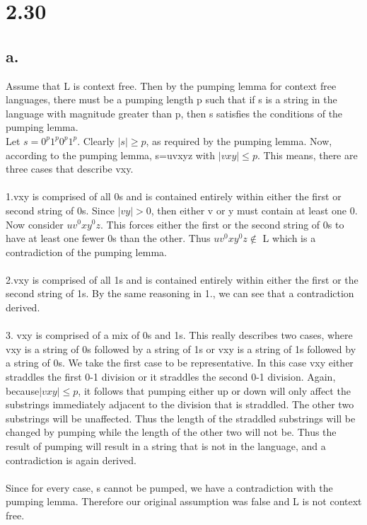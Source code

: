 \documentclass{scrartcl}
\begin{document}
\section*{2.30}
\subsection*{a.}
Assume that L is context free. Then by the pumping lemma for context free languages, there must be a pumping length p such that if s is a string in the language with magnitude greater than p, then s satisfies the conditions of the pumping lemma.\\
Let $s = 0^p1^p0^p1^p$. Clearly $\mid s \mid \geq p$,  as required by the pumping lemma.
Now, according to the pumping lemma, s=uvxyz with $\mid vxy \mid \leq p$. This means, there are three cases that describe vxy. \\
\\
1.vxy is comprised of all 0s and is contained entirely within either the first or second string of 0s. Since $\mid vy \mid > 0$, then either v or y must contain at least one 0. Now consider $uv^0xy^0z$.  This forces either the first or the second string of 0s to have at least one fewer 0s than the other. Thus $uv^0xy^0z \notin $ L which is a contradiction of the pumping
lemma.
\\
\\
2.vxy is comprised of all 1s and is contained entirely within either the
first or the second string of 1s. By the same reasoning in 1., we can see
that a contradiction derived.
\\
\\
3. vxy is comprised of a mix of 0s and 1s. This really describes two cases,
where vxy is a string of 0s followed by a string of 1s or vxy is a string of
1s followed by a string of 0s. We take the first case to be representative.
In this case vxy either straddles the first 0-1 division or it straddles the
second 0-1 division. Again, because$ \mid vxy \mid \leq p$, it follows that pumping
either up or down will only affect the substrings immediately adjacent
to the division that is straddled. The other two substrings will be
unaffected. Thus the length of the straddled substrings will be changed
by pumping while the length of the other two will not be. Thus the
result of pumping will result in a string that is not in the language, and
a contradiction is again derived.
\\
\\
Since for every case, s cannot be pumped, we have a contradiction with
the pumping lemma. Therefore our original assumption was false and L is
not context free.
\end{document}
